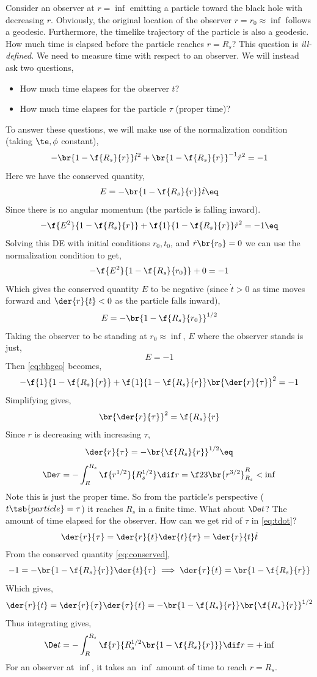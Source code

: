 \documentclass{article}
\begin{document}
Consider an observer at $r = \inf$ emitting a particle toward the black hole with decreasing $r$. Obviously, the original location of the observer $r = r_0 \approx \inf$ follows a geodesic. Furthermore, the timelike trajectory of the particle is also a geodesic. How much time is elapsed before the particle reaches $r=R_s$? This question is \textit{ill-defined}. We need to measure time with respect to an observer. We will instead ask two questions,
\begin{itemize}
    \item How much time elapses for the observer $t$?
    \item How much time elapses for the particle $\tau$ (proper time)?
\end{itemize}
To answer these questions, we will make use of the normalization condition (taking $\te, \phi$ constant),
\[ - \br{1- \f{R_s}{r}}\dot{t}^2 + \br{1 - \f{R_s}{r}}^{-1} \dot{r}^2 = -1 \]
Here we have the conserved quantity,
\[ E = - \br{1 - \f{R_s}{r}} \dot{t} \eq \label{eq:conserved} \]
Since there is no angular momentum (the particle is falling inward).
\[  - \f{E^2}{1 - \f{R_s}{r}} + \f{1}{1 - \f{R_s}{r}} \dot{r}^2 = -1 \eq \label{eq:bhgeo} \]
Solving this DE with initial conditions $r_0, t_0$, and $\dot{r}\br{r_0} = 0$ we can use the normalization condition to get,
\[ - \f{E^2}{1 - \f{R_s}{r_0}} + 0 = -1 \]
Which gives the conserved quantity $E$ to be negative (since $\dot{t} >0$ as time moves forward and $\der{r}{t} < 0$ as the particle falls inward),
\[ E = - \br{1 - \f{R_s}{r_0}}^{1/2} \]
Taking the observer to be standing at $r_0 \approx \inf$, $E$ where the observer stands is just,
\[ E = -1 \]
Then \eqref{eq:bhgeo} becomes,
\[ - \f{1}{1 -\f{R_s}{r}} + \f{1}{1-\f{R_s}{r}} \br{\der{r}{\tau}}^2 = -1 \]
Simplifying gives,
\[ \br{\der{r}{\tau}}^2 = \f{R_s}{r} \]
Since $r$ is decreasing with increasing $\tau$,
\[ \der{r}{\tau} = - \br{\f{R_s}{r}}^{1/2} \eq \label{eq:tdot} \]
\[ \De \tau = -\int_{R}^{R_s} \f{r^{1/2}}{R_s^{1/2}} \dif r = \f23 \br{r^{3/2}}_{R_s}^{R} < \inf \]
Note this is just the proper time. So from the particle's perspective ($t\tsb{particle} = \tau$) it reaches $R_s$ in a finite time. What about $\De t$? The amount of time elapsed for the observer. How can we get rid of $\tau$ in \eqref{eq:tdot}?
\[ \der{r}{\tau} = \der{r}{t} \der{t}{\tau} = \der{r}{t} \dot{t} \]
From the conserved quantity \eqref{eq:conserved},
\[ -1 = - \br{1 - \f{R_s}{r}} \der{t}{\tau} \implies \der{\tau}{t} = \br{1 - \f{R_s}{r}} \]
Which gives,
\[ \der{r}{t} = \der{r}{\tau} \der{\tau}{t} = -\br{1 - \f{R_s}{r}} \br{\f{R_s}{r}}^{1/2} \]
Thus integrating gives,
\[ \De t = -\int_{R}^{R_s} \f{r}{R_s^{1/2} \br{1 - \f{R_s}{r}}} \dif r = + \inf \]
For an observer at $\inf$, it takes an $\inf$ amount of time to reach $r = R_s$. \\
\end{document}
